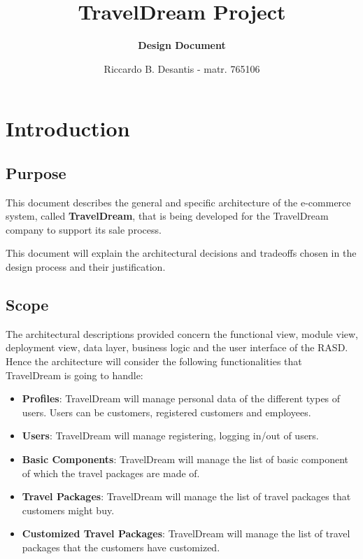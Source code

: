 \documentclass[a4paper,12pt]{book}
\begin{document}
\title{\textbf{TravelDream Project}}
\author{\textbf{Design Document}}
\date{Riccardo B. Desantis - matr. 765106}

\maketitle

\tableofcontents

\chapter{Introduction}

\section{Purpose}
This document describes the general and specific architecture of the e-commerce system, called \textbf{TravelDream}, that is being developed for the TravelDream company to support its sale process.

This document will explain the architectural decisions and tradeoffs chosen in the design process and their justification.

\section{Scope}
The architectural descriptions provided concern the functional view, module view, deployment view, data layer, business logic and the user interface of the RASD. Hence the architecture will consider the following functionalities that TravelDream is going to handle:
\begin{itemize}
  \item \textbf{Profiles}: TravelDream will manage personal data of the different types of users. Users can be customers, registered customers and employees.
  \item \textbf{Users}: TravelDream will manage registering, logging in/out of users.
  \item \textbf{Basic Components}: TravelDream will manage the list of basic component of which the travel packages are made of.
  \item \textbf{Travel Packages}: TravelDream will manage the list of travel packages that customers might buy.
  \item \textbf{Customized Travel Packages}: TravelDream will manage the list of travel packages that the customers have customized.
\end{itemize}
\end{document}
